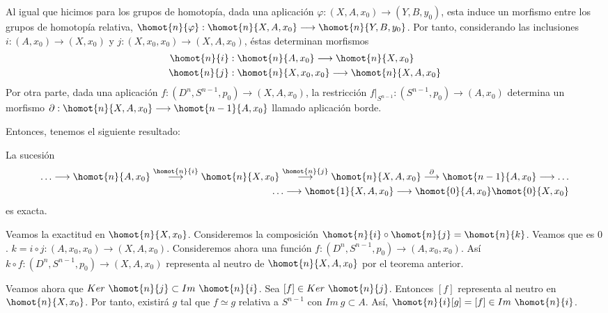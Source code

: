 Al igual que hicimos para los grupos de homotopía, dada una aplicación $\varphi :  (X, A, x_0) \longrightarrow (Y, B, y_0)$, esta induce un morfismo entre los grupos de homotopía relativa, $\homot{n}{\varphi} : \homot{n}{X, A, x_0} \longrightarrow \homot{n}{Y,B,y_0}$. Por tanto, considerando las inclusiones $i : (A, x_0) \longrightarrow (X, x_0)$ y $j: (X, x_0, x_0) \longrightarrow (X, A, x_0)$, éstas determinan morfismos
\begin{align*}
\homot{n}{i}&: \homot{n}{A, x_0} \longrightarrow \homot{n}{X, x_0} \\
\homot{n}{j}&: \homot{n}{X, x_0, x_0} \longrightarrow \homot{n}{X, A, x_0}
\end{align*}
Por otra parte, dada una aplicación $f: (D^n, S^{n-1}, p_0) \longrightarrow (X, A, x_0)$, la restricción $f \vert_{S^{n-1}} : (S^{n-1}, p_0) \longrightarrow (A, x_0)$ determina un morfismo $\partial : \homot{n}{X, A, x_0} \longrightarrow \homot{n-1}{A, x_0}$ llamado aplicación borde. \par
Entonces, tenemos el siguiente resultado:
\begin{teor}
La sucesión
\begin{align*} 
\ldots \longrightarrow \homot{n}{A, x_0} \stackrel{\homot{n}{i}}{\longrightarrow} \homot{n}{X, x_0} \stackrel{\homot{n}{j}}{\longrightarrow} \homot{n}{X, A, x_0} \stackrel{\partial}{\longrightarrow} \homot{n-1}{A, x_0} \longrightarrow \ldots \\
\ldots \longrightarrow \homot{1}{X, A, x_0} \longrightarrow \homot{0}{A, x_0} \homot{0}{X, x_0}
\end{align*}
es exacta.
\end{teor}
\begin{demo}
Veamos la exactitud en $\homot{n}{X, x_0}$. Consideremos la composición $\homot{n}{i} \circ \homot{n}{j} = \homot{n}{k}$. Veamos que es $0$. $k = i \circ j : (A, x_0, x_0) \longrightarrow (X, A, x_0)$. Consideremos ahora una función $f : (D^n, S^{n-1}, p_0) \longrightarrow (A, x_0, x_0)$. Así $k \circ f : (D^n, S^{n-1}, p_0) \longrightarrow (X, A, x_0)$ representa al neutro de $\homot{n}{X, A, x_0}$ por el teorema anterior. \par
Veamos ahora que $Ker \ \homot{n}{j} \subset Im \ \homot{n}{i}$. Sea $[f] \in Ker \ \homot{n}{j}$. Entonces $[f]$ representa al neutro en $\homot{n}{X, x_0}$. Por tanto, existirá $g$ tal que $f \simeq g$ relativa a $S^{n-1}$ con $Im \ g \subset A$. Así, $\homot{n}{i}[g] = [f] \in Im \ \homot{n}{i}$. \par
{}
\end{demo}

